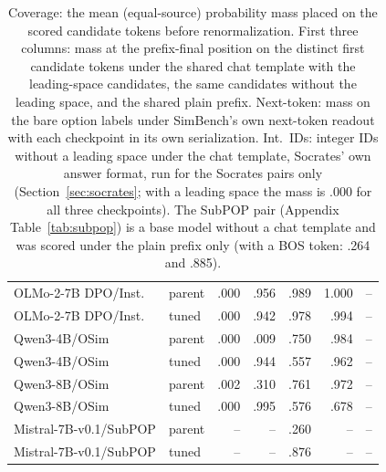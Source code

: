 \begin{table}[t]
\begin{tabular}{@{}llrrrrr@{}}
OLMo-2-7B DPO/Inst. & parent & .000 & .956 & .989 & 1.000 & -- \\
OLMo-2-7B DPO/Inst. & tuned & .000 & .942 & .978 & .994 & -- \\
Qwen3-4B/OSim & parent & .000 & .009 & .750 & .984 & -- \\
Qwen3-4B/OSim & tuned & .000 & .944 & .557 & .962 & -- \\
Qwen3-8B/OSim & parent & .002 & .310 & .761 & .972 & -- \\
Qwen3-8B/OSim & tuned & .000 & .995 & .576 & .678 & -- \\
Mistral-7B-v0.1/SubPOP & parent & -- & -- & .260 & -- & -- \\
Mistral-7B-v0.1/SubPOP & tuned & -- & -- & .876 & -- & -- \\
\bottomrule
\end{tabular}
\caption{Coverage: the mean (equal-source) probability mass placed on the scored candidate tokens before renormalization. First three columns: mass at the prefix-final position on the distinct first candidate tokens under the shared chat template with the leading-space candidates, the same candidates without the leading space, and the shared plain prefix. Next-token: mass on the bare option labels under SimBench's own next-token readout with each checkpoint in its own serialization. Int.\ IDs: integer IDs without a leading space under the chat template, Socrates' own answer format, run for the Socrates pairs only (Section~\ref{sec:socrates}; with a leading space the mass is .000 for all three checkpoints). The SubPOP pair (Appendix Table~\ref{tab:subpop}) is a base model without a chat template and was scored under the plain prefix only (with a BOS token: .264 and .885).}
\label{tab:coverage}
\end{table}
